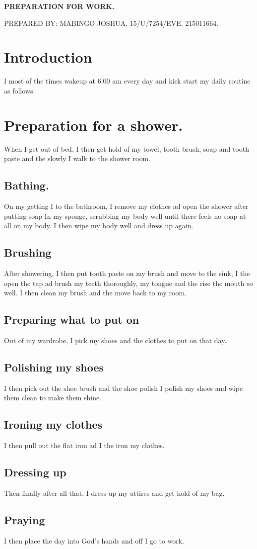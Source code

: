 \documentclass[options]{article}
\begin{document}
{\textbf{PREPARATION FOR WORK.}}


{PREPARED BY: MABINGO JOSHUA, 15/U/7254/EVE, 215011664.}

\section{\textbf{Introduction}}
I most of the times wakeup at 6:00 am every day and kick start my daily routine as follows:

\section{\textbf{Preparation for a shower.}}
When I get out of bed, I then get hold of my towel, tooth brush, soap and tooth paste and the slowly I walk to the shower room.

\subsection{\textbf{Bathing. }}
On my getting I to the bathroom, I remove my clothes ad open the shower after putting soap In my sponge, scrubbing my body well until there feels no soap at all on my body. I then wipe my body well and dress up again.

\subsection{\textbf{Brushing}}
After showering, I then put tooth paste on my brush and move to the sink, I the open the tap ad brush my teeth thoroughly, my tongue and the rise the mouth so well. I then clean my brush and the move back to my room.

\subsection{\textbf{Preparing what to put on }}
Out of my wardrobe, I pick my shoes and the clothes to put on that day.  

\subsection{\textbf{Polishing my shoes }}
 I then pick out the shoe brush and the shoe polish I polish my shoes and wipe them clean to make them shine.

\subsection{\textbf{Ironing my clothes }} 
I then pull out the flat iron ad I the iron my clothes.

\subsection{\textbf{Dressing up}}
Then finally after all that, I dress up my attires and get hold of my bag.

\subsection{\textbf{Praying}}
I then place the day into God’s hands and off I go to work.
\end{document}
